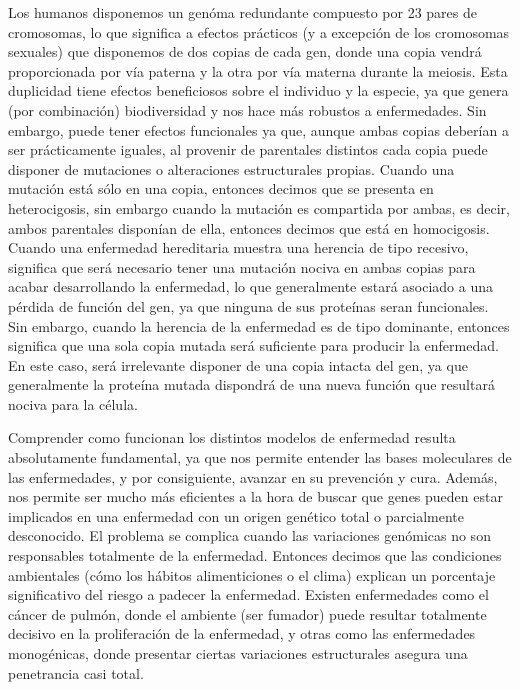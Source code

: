 \medskip
Los humanos disponemos un genóma redundante compuesto por 23 pares de cromosomas, lo que significa a efectos prácticos (y a excepción de los cromosomas sexuales) que disponemos de dos copias de cada gen, donde una copia vendrá proporcionada por vía paterna y la otra por vía materna durante la meiosis. Esta duplicidad tiene efectos beneficiosos sobre el individuo y la especie, ya que genera (por combinación) biodiversidad y nos hace más robustos a enfermedades. Sin embargo, puede tener efectos funcionales ya que, aunque ambas copias deberían a ser prácticamente iguales, al provenir de parentales distintos cada copia puede disponer de mutaciones o alteraciones estructurales propias. Cuando una mutación está sólo en una copia, entonces decimos que se presenta en heterocigosis, sin embargo cuando la mutación es compartida por ambas, es decir, ambos parentales disponían de ella, entonces decimos que está en homocigosis. Cuando una enfermedad hereditaria muestra una herencia de tipo recesivo, significa que será necesario tener una mutación nociva en ambas copias para acabar desarrollando la enfermedad, lo que generalmente estará asociado a una pérdida de función del gen, ya que ninguna de sus proteínas seran funcionales. Sin embargo, cuando la herencia de la enfermedad es de tipo dominante, entonces significa que una sola copia mutada será suficiente para producir la enfermedad. En este caso, será irrelevante disponer de una copia intacta del gen, ya que generalmente la proteína mutada dispondrá de una nueva función que resultará nociva para la célula.  

\medskip
Comprender como funcionan los distintos modelos de enfermedad resulta absolutamente fundamental, ya que nos permite entender las bases moleculares de las enfermedades, y por consiguiente, avanzar en su prevención y cura. Además, nos permite ser mucho más eficientes a la hora de buscar que genes pueden estar implicados en una enfermedad con un origen genético total o parcialmente desconocido. El problema se complica cuando las variaciones genómicas no son responsables totalmente de la enfermedad. Entonces decimos que las condiciones ambientales (cómo los hábitos alimenticiones o el clima) explican un porcentaje significativo del riesgo a padecer la enfermedad. Existen enfermedades como el cáncer de pulmón, donde el ambiente (ser fumador) puede resultar totalmente decisivo en la proliferación de la enfermedad, y otras como las enfermedades monogénicas, donde presentar ciertas variaciones estructurales asegura una penetrancia casi total.
 
